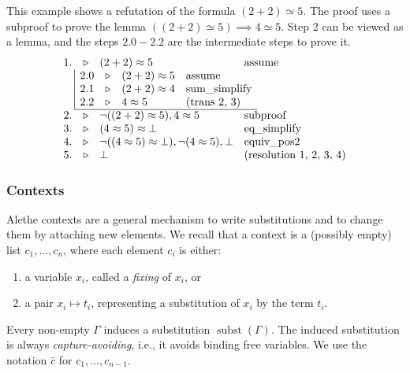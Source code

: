 \begin{example}\label{ex:subproof}
This example shows a refutation of the formula $(2 + 2 ) \simeq 5$. The proof uses a subproof to prove the lemma $((2 + 2 ) \simeq 5) \implies 4 \simeq 5$.
Step 2 can be viewed as a lemma, and the steps $2.0 - 2.2$ are the intermediate steps to prove it.
\[
\begin{array}{r c l l}
1. & \triangleright & (2 + 2) \approx 5 & \text{assume} \\
\multicolumn{4}{l}{%
\begin{array}{r |r c l l}
& 2.0 & \triangleright & (2 + 2) \approx 5 & \text{assume} \\
& 2.1 & \triangleright & (2 + 2) \approx 4 & \text{sum\_simplify} \\
& 2.2 & \triangleright & 4 \approx 5 & \text{(trans 2, 3)} \\
\cline{2-5}
\end{array}
} \\
2. & \triangleright & \neg((2 + 2) \approx 5), 4 \approx 5 & \text{subproof} \\
3. & \triangleright & (4 \approx 5) \approx \bot & \text{eq\_simplify} \\
4. & \triangleright & \neg((4 \approx 5) \approx \bot), \neg(4 \approx 5), \bot & \text{equiv\_pos2} \\
5. & \triangleright & \bot & \text{(resolution 1, 2, 3, 4)}
\end{array}
\]
\end{example}

\subsubsection{Contexts}

Alethe contexts are a general mechanism to write substitutions and to change them by attaching new elements.
We recall that a context is a (possibly empty) list $c_1, \dots, c_n$, where each element $c_i$ is either:
\begin{enumerate}
  \item a variable $x_i$, called a \emph{fixing} of $x_i$, or
  \item a pair $x_i \mapsto t_i$, representing a substitution of $x_i$ by the term $t_i$.
\end{enumerate}

Every non-empty $\Gamma$ induces a substitution $\mathop{subst}(\Gamma)$.
The induced substitution is always \emph{capture-avoiding}, i.e., it avoids binding free variables.
We use the notation $\bar{c}$ for $c_1, \dots, c_{n-1}$.

